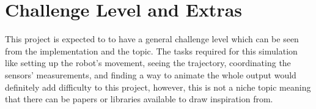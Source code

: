 \documentclass{article}
\begin{document}
\section{Challenge Level and Extras}
This project is expected to to have a general challenge level which can be seen from the implementation and the topic. The tasks required for this simulation like setting up the robot's movement, seeing the trajectory, coordinating the sensors' measurements, and finding a way to animate the whole output would definitely add difficulty to this project, however, this is not a niche topic meaning that there can be papers or libraries available to draw inspiration from.

\newpage{}
\end{document}
